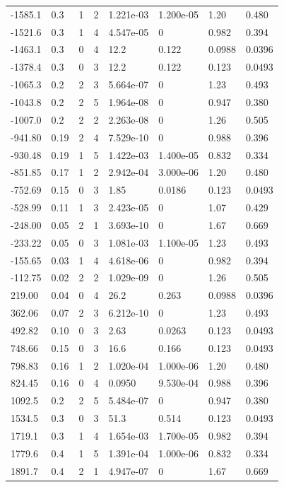 \documentclass[preview]{standalone}
\begin{document}
{{\begin{tabular}{L{1.2cm}C{1.2cm} C{0.3cm}C{0.5cm} C{1.4cm}C{1.4cm} C{1.4cm}C{1.4cm}}
  -1585.1  &   0.3  & 1     &  2 &  1.221e-03  & 1.200e-05  & 1.20 &  0.480   \\ 
  -1521.6  &   0.3  & 1     &  4 &  4.547e-05  & 0  & 0.982 &  0.394   \\ 
  -1463.1  &   0.3  & 0     &  4 &  12.2  & 0.122  & 0.0988 &  0.0396   \\ 
  -1378.4  &   0.3  & 0     &  3 &  12.2  & 0.122  & 0.123 &  0.0493   \\ 
  -1065.3  &   0.2  & 2     &  3 &  5.664e-07  & 0  & 1.23 &  0.493   \\ 
  -1043.8  &   0.2  & 2     &  5 &  1.964e-08  & 0  & 0.947 &  0.380   \\ 
  -1007.0  &   0.2  & 2     &  2 &  2.263e-08  & 0  & 1.26 &  0.505   \\ 
  -941.80  &  0.19  & 2     &  4 &  7.529e-10  & 0  & 0.988 &  0.396   \\ 
  -930.48  &  0.19  & 1     &  5 &  1.422e-03  & 1.400e-05  & 0.832 &  0.334   \\ 
  -851.85  &  0.17  & 1     &  2 &  2.942e-04  & 3.000e-06  & 1.20 &  0.480   \\ 
  -752.69  &  0.15  & 0     &  3 &  1.85  & 0.0186  & 0.123 &  0.0493   \\ 
  -528.99  &  0.11  & 1     &  3 &  2.423e-05  & 0  & 1.07 &  0.429   \\ 
  -248.00  &  0.05  & 2     &  1 &  3.693e-10  & 0  & 1.67 &  0.669   \\ 
  -233.22  &  0.05  & 0     &  3 &  1.081e-03  & 1.100e-05  & 1.23 &  0.493   \\ 
  -155.65  &  0.03  & 1     &  4 &  4.618e-06  & 0  & 0.982 &  0.394   \\ 
  -112.75  &  0.02  & 2     &  2 &  1.029e-09  & 0  & 1.26 &  0.505   \\ 
  219.00  &  0.04  & 0     &  4 &  26.2  & 0.263  & 0.0988 &  0.0396   \\ 
  362.06  &  0.07  & 2     &  3 &  6.212e-10  & 0  & 1.23 &  0.493   \\ 
  492.82  &  0.10  & 0     &  3 &  2.63  & 0.0263  & 0.123 &  0.0493   \\ 
  748.66  &  0.15  & 0     &  3 &  16.6  & 0.166  & 0.123 &  0.0493   \\ 
  798.83  &  0.16  & 1     &  2 &  1.020e-04  & 1.000e-06  & 1.20 &  0.480   \\ 
  824.45  &  0.16  & 0     &  4 &  0.0950  & 9.530e-04  & 0.988 &  0.396   \\ 
  1092.5  &   0.2  & 2     &  5 &  5.484e-07  & 0  & 0.947 &  0.380   \\ 
  1534.5  &   0.3  & 0     &  3 &  51.3  & 0.514  & 0.123 &  0.0493   \\ 
  1719.1  &   0.3  & 1     &  4 &  1.654e-03  & 1.700e-05  & 0.982 &  0.394   \\ 
  1779.6  &   0.4  & 1     &  5 &  1.391e-04  & 1.000e-06  & 0.832 &  0.334   \\ 
  1891.7  &   0.4  & 2     &  1 &  4.947e-07  & 0  & 1.67 &  0.669   \\ 
\hline 
\end{tabular} 

}}
\end{document}
